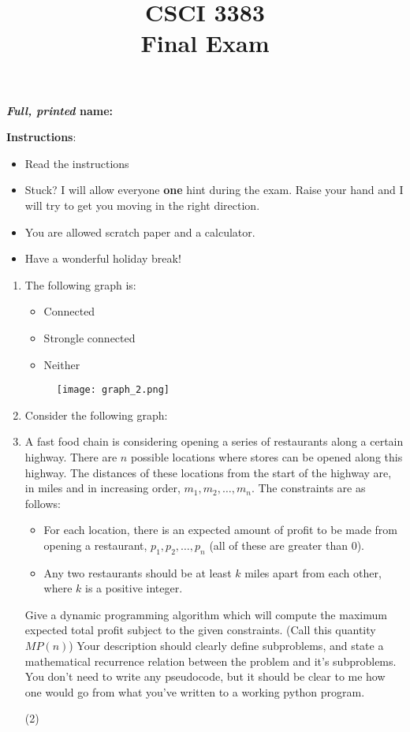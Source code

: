 \documentclass[12pt]{article}
\title{CSCI 3383 \\Final Exam}
\date{}
\begin{document}
\maketitle
\textbf{\emph{Full, printed} name: }
\vspace{1cm}

\textbf{Instructions}: 
\begin{itemize}
    \item Read the instructions
    \item Stuck? I will allow everyone \textbf{one} hint during the exam. Raise your hand and I will try to get you moving in the right direction.  
    \item You are allowed scratch paper and a calculator. 
    \item Have a wonderful holiday break!
\end{itemize} 


\newpage
\begin{enumerate}
    \item The following graph is:
    \begin{itemize}
        \item Connected
        \item Strongle connected
        \item Neither
    \end{itemize}
    \begin{wrapfigure}{h}{5cm}
        \texttt{[image: graph\_2.png]}
    \end{wrapfigure}         
    \item Consider the following graph:
    \item A fast food chain is considering opening a series of restaurants along a certain highway. There are $n$ possible locations where stores can be opened along this highway. The distances of these locations from the start of the highway are, in miles and in increasing order, $m_1, m_2, \ldots, m_n$. The constraints are as follows:
    \begin{itemize}
        \item For each location, there is an expected amount of profit to be made from opening a restaurant, $p_1, p_2, \ldots, p_n$ (all of these are greater than $0$).
        \item Any two restaurants should be at least $k$ miles apart from each other, where $k$ is a positive integer. 
    \end{itemize} 
    Give a dynamic programming algorithm which will compute the maximum expected total profit subject to the given constraints. (Call this quantity $MP(n)$) Your description should clearly define subproblems, and state a mathematical recurrence relation between the problem and it's subproblems. You don't need to write any pseudocode, but it should be clear to me how one would go from what you've written to a working python program. 

    \item[(2)] 
\end{enumerate}
\end{document}
